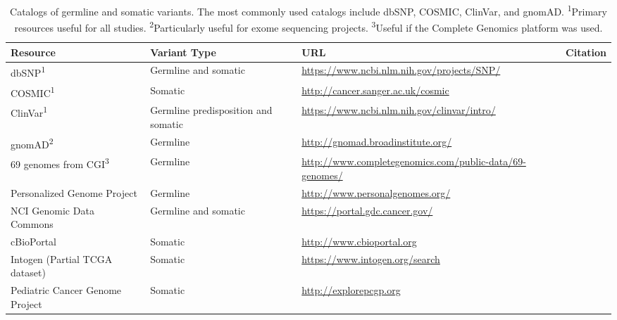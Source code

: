 \documentclass{article}
\begin{document}
\pagebreak

\begin{table}
  \footnotesize
\centering
\begin{tabular}{>{\raggedright}p{1.25in}p{1.25in}p{1.5in}p{1.25in}<{\raggedright}}
  \toprule
  Resource & Variant Type & URL & Citation \\
  \midrule
  dbSNP\textsuperscript{1} & Germline and somatic &
  \url{https://www.ncbi.nlm.nih.gov/projects/SNP/} &
  \parencite{Sherry2001-li} \\
  COSMIC\textsuperscript{1} & Somatic & \url{http://cancer.sanger.ac.uk/cosmic} &
  \parencite{Reva2011-en} \\
  ClinVar\textsuperscript{1} & Germline predisposition and somatic & \url{https://www.ncbi.nlm.nih.gov/clinvar/intro/} & \parencite{Landrum2016-ul} \\
  gnomAD\textsuperscript{2}  & Germline & \url{http://gnomad.broadinstitute.org/} & \parencite{Lek2016-bb} \\
  69 genomes from CGI\textsuperscript{3} & Germline & \url{http://www.completegenomics.com/public-data/69-genomes/} & \parencite{Drmanac2010-od} \\
  Personalized Genome Project & Germline & \url{http://www.personalgenomes.org/} & \parencite{Church2005-lr} \\
  NCI Genomic Data Commons & Germline and somatic & \url{https://portal.gdc.cancer.gov/} & \parencite{Grossman2016-sk} \\
  cBioPortal & Somatic & \url{http://www.cbioportal.org} & \parencite{Cerami2012-el,Gao2013-li} \\
  Intogen (Partial TCGA dataset) & Somatic & \url{https://www.intogen.org/search} & \parencite{Rubio-Perez2015-ek,Gonzalez-Perez2013-cl} \\
  Pediatric Cancer Genome Project  & Somatic & \url{http://explorepcgp.org} & \parencite{Downing2012-do} \\
  \bottomrule
\end{tabular}
\caption{Catalogs of germline and somatic variants. The most commonly
  used catalogs include dbSNP, COSMIC, ClinVar, and
  gnomAD. \textsuperscript{1}Primary
  resources useful for all studies. \textsuperscript{2}Particularly useful for
  exome sequencing projects. \textsuperscript{3}Useful if
  the Complete Genomics platform was used.} 
\label{table:1}
\end{table}
\end{document}
